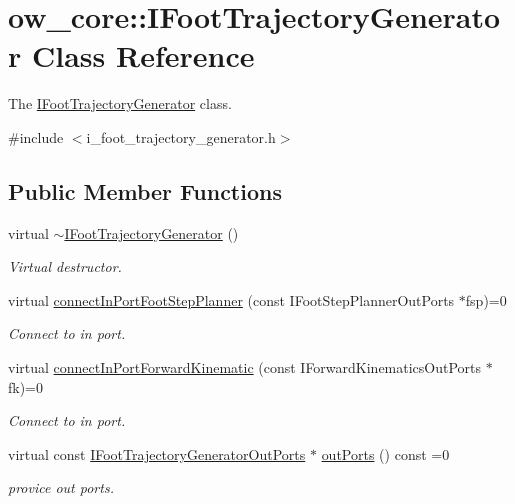 \hypertarget{classow__core_1_1IFootTrajectoryGenerator}{}\section{ow\+\_\+core\+:\+:I\+Foot\+Trajectory\+Generator Class Reference}
\label{classow__core_1_1IFootTrajectoryGenerator}


The \hyperlink{classow__core_1_1IFootTrajectoryGenerator}{I\+Foot\+Trajectory\+Generator} class.  




{\ttfamily \#include $<$i\+\_\+foot\+\_\+trajectory\+\_\+generator.\+h$>$}

\subsection*{Public Member Functions}
\begin{DoxyCompactItemize}
\item 
virtual \hyperlink{classow__core_1_1IFootTrajectoryGenerator_a67087027cedeb175cf41c5e7eacc8e87}{$\sim$\+I\+Foot\+Trajectory\+Generator} ()\hypertarget{classow__core_1_1IFootTrajectoryGenerator_a67087027cedeb175cf41c5e7eacc8e87}{}\label{classow__core_1_1IFootTrajectoryGenerator_a67087027cedeb175cf41c5e7eacc8e87}

\begin{DoxyCompactList}\small\item\em Virtual destructor. \end{DoxyCompactList}\item 
virtual \hyperlink{classow__core_1_1IFootTrajectoryGenerator_ac18698993d68a408ecb0820b1ce0cf4e}{connect\+In\+Port\+Foot\+Step\+Planner} (const I\+Foot\+Step\+Planner\+Out\+Ports $\ast$fsp)=0
\begin{DoxyCompactList}\small\item\em Connect to in port. \end{DoxyCompactList}\item 
virtual \hyperlink{classow__core_1_1IFootTrajectoryGenerator_ae592f6abe58e94f8197a4b29d4f52b6d}{connect\+In\+Port\+Forward\+Kinematic} (const I\+Forward\+Kinematics\+Out\+Ports $\ast$fk)=0
\begin{DoxyCompactList}\small\item\em Connect to in port. \end{DoxyCompactList}\item 
virtual const \hyperlink{classow__core_1_1IFootTrajectoryGeneratorOutPorts}{I\+Foot\+Trajectory\+Generator\+Out\+Ports} $\ast$ \hyperlink{classow__core_1_1IFootTrajectoryGenerator_add02082c2d05777990753ce28449cf4c}{out\+Ports} () const =0
\begin{DoxyCompactList}\small\item\em provice out ports. \end{DoxyCompactList}\end{DoxyCompactItemize}


